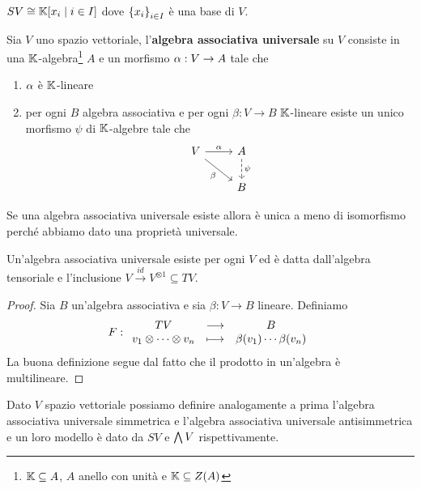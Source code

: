 \begin{remark}
$SV\cong \mathbb{K}[x_i\mid i\in I]$ dove $\left\{{x_i}\right\}_{i\in I}$ \`e una base di $V$.
\end{remark}


\begin{definition}
Sia $V$ uno spazio vettoriale, l'\textbf{algebra associativa universale} su $V$ consiste in una $\mathbb{K}$-algebra\footnote{$\mathbb{K}\subseteq A$, $A$ anello con unit\`a e $\mathbb{K}\subseteq Z(A)$} $A$ e un morfismo $\alpha:V\to A$ tale che
\begin{enumerate}
    \item $\alpha$ \`e $\mathbb{K}$-lineare
    \item per ogni $B$ algebra associativa e per ogni $\beta:V\to B$ $\mathbb{K}$-lineare esiste un unico morfismo $\psi$ di $\mathbb{K}$-algebre tale che
\[\begin{tikzcd}
	V & A \\
	& B
	\arrow["\al", from=1-1, to=1-2]
	\arrow["\beta"', from=1-1, to=2-2]
	\arrow["\psi", dashed, from=1-2, to=2-2]
\end{tikzcd}\]
\end{enumerate}
\end{definition}
\begin{remark}
Se una algebra associativa universale esiste allora \`e unica a meno di isomorfismo perch\'e abbiamo dato una propriet\`a universale.
\end{remark}

\begin{remark}
Un'algebra associativa universale esiste per ogni $V$ ed \`e datta dall'algebra tensoriale e l'inclusione $V\overset{id}{\to} V^{\otimes 1}\subseteq TV$.
\end{remark}
\begin{proof}
Sia $B$ un'algebra associativa e sia $\beta:V\to B$ lineare. Definiamo
\[F:\begin{array}{ccc} {TV} & \longrightarrow & {B}\\ {v_1\otimes\cdots\otimes v_n} & \longmapsto & {\beta(v_1)\cdots \beta(v_n)} \end{array}\]
La buona definizione segue dal fatto che il prodotto in un'algebra \`e multilineare.
\end{proof}

\begin{remark}
Dato $V$ spazio vettoriale possiamo definire analogamente a prima l'algebra associativa universale simmetrica e l'algebra associativa universale antisimmetrica e un loro modello \`e dato da $SV$ e $\bigwedge V$ rispettivamente.
\end{remark}













